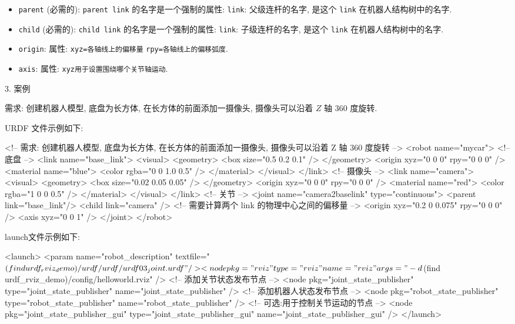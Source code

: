 \documentclass[openany, fontset=windowsold]{ctexbook}
\theoremstyle{kaiti}
\theoremstyle{normal}
\begin{document}
\begin{itemize}
  \item \verb|parent| (必需的): \verb|parent link| 的名字是一个强制的属性: \verb|link|: 父级连杆的名字, 是这个 \verb|link| 在机器人结构树中的名字.
  \item \verb|child| (必需的): \verb|child link| 的名字是一个强制的属性: \verb|link|: 子级连杆的名字, 是这个 \verb|link| 在机器人结构树中的名字.
  \item \verb|origin|: 属性: \verb|xyz=各轴线上的偏移量| \verb|rpy=各轴线上的偏移弧度|.
  \item \verb|axis|: 属性: \verb|xyz用于设置围绕哪个关节轴运动|.
\end{itemize}

3. 案例

需求: 创建机器人模型, 底盘为长方体, 在长方体的前面添加一摄像头, 摄像头可以沿着 $Z$ 轴 360 度旋转.

URDF 文件示例如下:

\begin{xml}
  <!-- 
      需求: 创建机器人模型, 底盘为长方体, 
          在长方体的前面添加一摄像头, 
          摄像头可以沿着 Z 轴 360 度旋转
  -->
  <robot name="mycar">
      <!-- 底盘 -->
      <link name="base_link">
          <visual>
              <geometry>
                  <box size="0.5 0.2 0.1" />
              </geometry>
              <origin xyz="0 0 0" rpy="0 0 0" />
              <material name="blue">
                  <color rgba="0 0 1.0 0.5" />
              </material>
          </visual>
      </link>
      <!-- 摄像头 -->
      <link name="camera">
          <visual>
              <geometry>
                  <box size="0.02 0.05 0.05" />
              </geometry>
              <origin xyz="0 0 0" rpy="0 0 0" />
              <material name="red">
                  <color rgba="1 0 0 0.5" />
              </material>
          </visual>
      </link>
      <!-- 关节 -->
      <joint name="camera2baselink" type="continuous">
          <parent link="base_link"/>
          <child link="camera" />
          <!-- 需要计算两个 link 的物理中心之间的偏移量 -->
          <origin xyz="0.2 0 0.075" rpy="0 0 0" />
          <axis xyz="0 0 1" />
      </joint>
  </robot>
\end{xml}

launch文件示例如下:

\begin{xml}
  <launch>
      <param name="robot_description" textfile="$(find urdf_rviz_demo)/urdf/urdf/urdf03_joint.urdf" />
      <node pkg="rviz" type="rviz" name="rviz" args="-d $(find urdf_rviz_demo)/config/helloworld.rviz" /> 
      <!-- 添加关节状态发布节点 -->
      <node pkg="joint_state_publisher" type="joint_state_publisher" name="joint_state_publisher" />
      <!-- 添加机器人状态发布节点 -->
      <node pkg="robot_state_publisher" type="robot_state_publisher" name="robot_state_publisher" />
      <!-- 可选:用于控制关节运动的节点 -->
      <node pkg="joint_state_publisher_gui" type="joint_state_publisher_gui" name="joint_state_publisher_gui" />
  </launch>
\end{xml}
\end{document}
